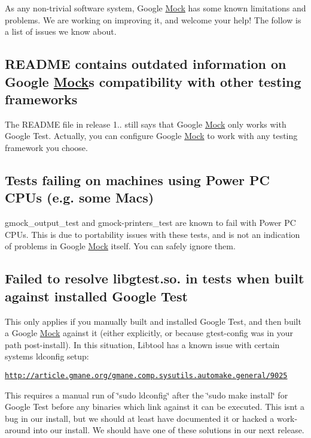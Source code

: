 As any non-\/trivial software system, Google \hyperlink{class_mock}{Mock} has some known limitations and problems. We are working on improving it, and welcome your help! The follow is a list of issues we know about.

\subsection*{R\+E\+A\+D\+ME contains outdated information on Google \hyperlink{class_mock}{Mock}\textquotesingle{}s compatibility with other testing frameworks}

The {\ttfamily R\+E\+A\+D\+ME} file in release 1.. still says that Google \hyperlink{class_mock}{Mock} only works with Google Test. Actually, you can configure Google \hyperlink{class_mock}{Mock} to work with any testing framework you choose.

\subsection*{Tests failing on machines using Power PC C\+P\+Us (e.\+g. some Macs)}

{\ttfamily gmock\+\_\+output\+\_\+test} and {\ttfamily gmock-\/printers\+\_\+test} are known to fail with Power PC C\+P\+Us. This is due to portability issues with these tests, and is not an indication of problems in Google \hyperlink{class_mock}{Mock} itself. You can safely ignore them.

\subsection*{Failed to resolve libgtest.\+so. in tests when built against installed Google Test}

This only applies if you manually built and installed Google Test, and then built a Google \hyperlink{class_mock}{Mock} against it (either explicitly, or because gtest-\/config was in your path post-\/install). In this situation, Libtool has a known issue with certain systems\textquotesingle{} ldconfig setup\+:

\href{http://article.gmane.org/gmane.comp.sysutils.automake.general/9025}{\tt http\+://article.\+gmane.\+org/gmane.\+comp.\+sysutils.\+automake.\+general/9025}

This requires a manual run of \char`\"{}sudo ldconfig\char`\"{} after the \char`\"{}sudo make install\char`\"{} for Google Test before any binaries which link against it can be executed. This isn\textquotesingle{}t a bug in our install, but we should at least have documented it or hacked a work-\/around into our install. We should have one of these solutions in our next release. 